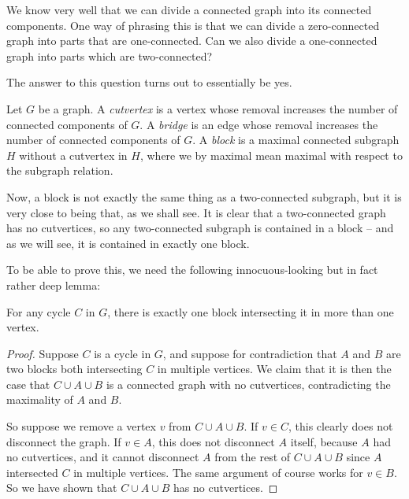\documentclass[nobib]{tufte-handout}
\begin{document}
We know very well that we can divide a connected graph into its connected components. One way of phrasing this is that we can divide a zero-connected graph into parts that are one-connected. Can we also divide a one-connected graph into parts which are two-connected?

The answer to this question turns out to essentially be yes.

\begin{definition}
  Let $G$ be a graph. A \emph{cutvertex} is a vertex whose removal increases the number of connected components of $G$. A \emph{bridge} is an edge whose removal increases the number of connected components of $G$. A \emph{block} is a maximal connected subgraph $H$ without a cutvertex in $H$, where we by maximal mean maximal with respect to the subgraph relation.
\end{definition}

Now, a block is not exactly the same thing as a two-connected subgraph, but it is very close to being that, as we shall see. It is clear that a two-connected graph has no cutvertices, so any two-connected subgraph is contained in a block -- and as we will see, it is contained in exactly one block.

To be able to prove this, we need the following innocuous-looking but in fact rather deep lemma:

\begin{lemma}\label{lemma:block_cycle_intersection}
  For any cycle $C$ in $G$, there is exactly one block intersecting it in more than one vertex.

  \begin{proof}
    Suppose $C$ is a cycle in $G$, and suppose for contradiction that $A$ and $B$ are two blocks both intersecting $C$ in multiple vertices. We claim that it is then the case that $C \cup A \cup B$ is a connected graph with no cutvertices, contradicting the maximality of $A$ and $B$.

    So suppose we remove a vertex $v$ from $C \cup A \cup B$. If $v \in C$, this clearly does not disconnect the graph. If $v\in A$, this does not disconnect $A$ itself, because $A$ had no cutvertices, and it cannot disconnect $A$ from the rest of $C \cup A \cup B$ since $A$ intersected $C$ in multiple vertices. The same argument of course works for $v \in B$. So we have shown that $C \cup A \cup B$ has no cutvertices.
  \end{proof}
\end{lemma}
\end{document}
